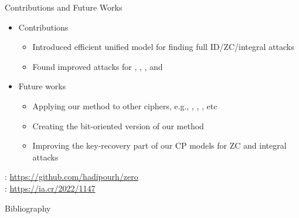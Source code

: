 \documentclass[table,aspectratio=169]{beamer}
\begin{document}
\begin{frame}{Contributions and Future Works}
\vspace{-0.5cm}
\begin{itemize}
\item Contributions
\begin{itemize}
\small
\item[\textcolor{tugblue}{\faChevronCircleRight}] Introduced efficient unified model for finding full ID/ZC/integral attacks
\item[\textcolor{tugblue}{\faChevronCircleRight}] Found improved attacks for , , , and 
\end{itemize}
\item Future works
\begin{itemize}
\small
\item[\faRoad] Applying our method to other ciphers, e.g., , , , etc
\item[\faRoad] Creating the bit-oriented version of our method
\item[\faRoad] Improving the key-recovery part of our CP models for ZC and integral attacks
\end{itemize} 
\end{itemize}
\begin{center}
\vspace{0.10cm}


\faGithub: \url{https://github.com/hadipourh/zero}\\
\vspace{0.1cm}
\faArchive: \url{https://ia.cr/2022/1147}
\end{center}
\end{frame}


















\begin{frame}[allowframebreaks]{Bibliography}
  \printbibliography
\end{frame}
\end{document}
